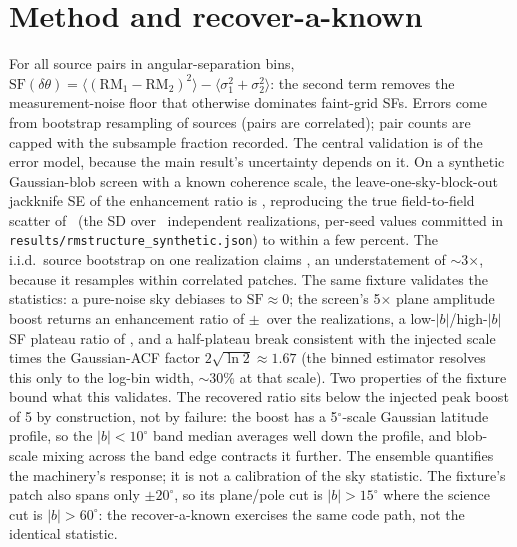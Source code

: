 \documentclass[twocolumn]{aastex631}
\newcommand{\code}[1]{\texttt{#1}}
\begin{document}
\section{Method and recover-a-known}
For all source pairs in angular-separation bins,
$\mathrm{SF}(\delta\theta)=\langle(\mathrm{RM}_1-\mathrm{RM}_2)^2\rangle-\langle\sigma_1^2+
\sigma_2^2\rangle$: the second term removes the measurement-noise floor that otherwise dominates
faint-grid SFs. Errors come from bootstrap resampling of sources (pairs are correlated);
pair counts are capped with the subsample fraction recorded. The central validation is of the
error model, because the main result's uncertainty depends on it. On a synthetic
Gaussian-blob screen with a known coherence scale, the leave-one-sky-block-out jackknife SE of
the enhancement ratio is \rmsSynRatioJkSe, reproducing the true field-to-field scatter of
\rmsSynRatioEnsSd\ (the SD over \rmsSynNReal\ independent realizations, per-seed values
committed in \code{results/rmstructure\_synthetic.json}) to within a few percent. The
i.i.d.\ source bootstrap on one realization claims \rmsSynRatioSe, an understatement of
$\sim$3$\times$, because it resamples within correlated patches. The same fixture validates
the statistics: a pure-noise sky debiases to $\mathrm{SF}\approx0$; the screen's 5$\times$ plane
amplitude boost returns an enhancement ratio of \rmsSynRatioEns$\pm$\rmsSynRatioEnsSd\ over the
realizations, a low-$|b|$/high-$|b|$ SF plateau ratio of \rmsSynPlatRatio, and a half-plateau
break consistent with the injected scale times the Gaussian-ACF factor
$2\sqrt{\ln 2}\approx1.67$
(the binned estimator resolves this only to the log-bin width, $\sim$30\% at that scale).
Two properties of the fixture bound what this validates. The recovered ratio sits below the
injected peak boost of 5 by construction, not by failure: the boost has a 5$^\circ$-scale
Gaussian latitude profile, so the $|b|<10^\circ$ band median averages well down the profile, and
blob-scale mixing across the band edge contracts it further. The ensemble quantifies the
machinery's response; it is not a calibration of the sky statistic. The fixture's
patch also spans only $\pm20^\circ$, so its plane/pole cut is $|b|>15^\circ$ where the science cut is
$|b|>60^\circ$: the recover-a-known exercises the same code path, not the identical statistic.
\end{document}

